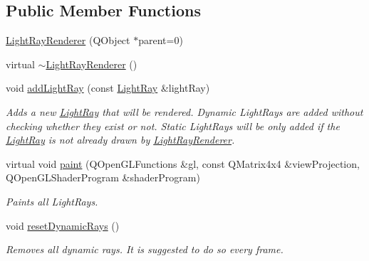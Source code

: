 \subsection*{Public Member Functions}
\begin{DoxyCompactItemize}
\item 
\hyperlink{class_light_ray_renderer_a081e83e5e16a36faec002878052aab04}{Light\+Ray\+Renderer} (Q\+Object $\ast$parent=0)
\item 
virtual \hyperlink{class_light_ray_renderer_ac751be83a9d351286b0f89693c425205}{$\sim$\+Light\+Ray\+Renderer} ()
\item 
void \hyperlink{class_light_ray_renderer_a0e481c5c466f2423e06adfde398f6a28}{add\+Light\+Ray} (const \hyperlink{class_light_ray}{Light\+Ray} \&light\+Ray)
\begin{DoxyCompactList}\small\item\em Adds a new \hyperlink{class_light_ray}{Light\+Ray} that will be rendered.  Dynamic Light\+Rays are added without checking whether they exist or not. Static Light\+Rays will be only added if the \hyperlink{class_light_ray}{Light\+Ray} is not already drawn by \hyperlink{class_light_ray_renderer}{Light\+Ray\+Renderer}. \end{DoxyCompactList}\item 
virtual void \hyperlink{class_light_ray_renderer_a3270c30bd4f5eba01e543bb196c501ed}{paint} (Q\+Open\+G\+L\+Functions \&gl, const Q\+Matrix4x4 \&view\+Projection, Q\+Open\+G\+L\+Shader\+Program \&shader\+Program)
\begin{DoxyCompactList}\small\item\em Paints all Light\+Rays. \end{DoxyCompactList}\item 
void \hyperlink{class_light_ray_renderer_a6274b441ae15e56176d1d4d7d86ed540}{reset\+Dynamic\+Rays} ()
\begin{DoxyCompactList}\small\item\em Removes all dynamic rays. It is suggested to do so every frame. \end{DoxyCompactList}\end{DoxyCompactItemize}
